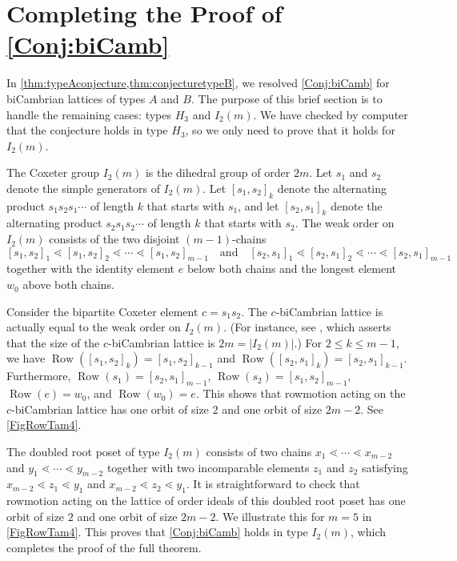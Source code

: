 \documentclass[11pt]{amsart}
\theoremstyle{definition}
\DeclareMathOperator{\row}{Row}
\begin{document}
\section{Completing the Proof of \cref{Conj:biCamb}}\label{Sec:BiCambrianOther}
In \cref{thm:typeAconjecture,thm:conjecturetypeB}, we resolved \cref{Conj:biCamb} for biCambrian lattices of types $A$ and $B$. The purpose of this brief section is to handle the remaining cases: types $H_3$ and $I_2(m)$. We have checked by computer that the conjecture holds in type $H_3$, so we only need to prove that it holds for $I_2(m)$. 

The Coxeter group $I_2(m)$ is the dihedral group of order $2m$. Let $s_1$ and $s_2$ denote the simple generators of $I_2(m)$. Let $[s_1,s_2]_k$ denote the alternating product $s_1s_2s_1\cdots$ of length $k$ that starts with $s_1$, and let $[s_2,s_1]_k$ denote the alternating product $s_2s_1s_2\cdots$ of length $k$ that starts with $s_2$. The weak order on $I_2(m)$ consists of the two disjoint $(m-1)$-chains \[[s_1,s_2]_1\lessdot[s_1,s_2]_2\lessdot\cdots\lessdot[s_1,s_2]_{m-1}\quad\text{and}\quad[s_2,s_1]_1\lessdot[s_2,s_1]_2\lessdot\cdots\lessdot[s_2,s_1]_{m-1}\] together with the identity element $e$ below both chains and the longest element $w_0$ above both chains.

Consider the bipartite Coxeter element $c=s_1s_2$. The $c$-biCambrian lattice is actually equal to the weak order on $I_2(m)$. (For instance, see \cite[Theorem~1.4]{BarnardReading}, which asserts that the size of the $c$-biCambrian lattice is $2m=|I_2(m)|$.) For $2\leq k\leq m-1$, we have $\row([s_1,s_2]_k)=[s_1,s_2]_{k-1}$ and $\row([s_2,s_1]_k)=[s_2,s_1]_{k-1}$. Furthermore, $\row(s_1)=[s_2,s_1]_{m-1}$, $\row(s_2)=[s_1,s_2]_{m-1}$, $\row(e)=w_0$, and $\row(w_0)=e$. This shows that rowmotion acting on the $c$-biCambrian lattice has one orbit of size $2$ and one orbit of size $2m-2$. See \cref{FigRowTam4}. 

The doubled root poset of type $I_2(m)$ consists of two chains $x_1\lessdot\cdots\lessdot x_{m-2}$ and $y_1\lessdot\cdots\lessdot y_{m-2}$ together with two incomparable elements $z_1$ and $z_2$ satisfying $x_{m-2}\lessdot z_1\lessdot y_1$ and $x_{m-2}\lessdot z_2\lessdot y_1$. It is straightforward to check that rowmotion acting on the lattice of order ideals of this doubled root poset has one orbit of size $2$ and one orbit of size $2m-2$. We illustrate this for $m=5$ in \cref{FigRowTam4}. This proves that \cref{Conj:biCamb} holds in type $I_2(m)$, which completes the proof of the full theorem. 
\end{document}
